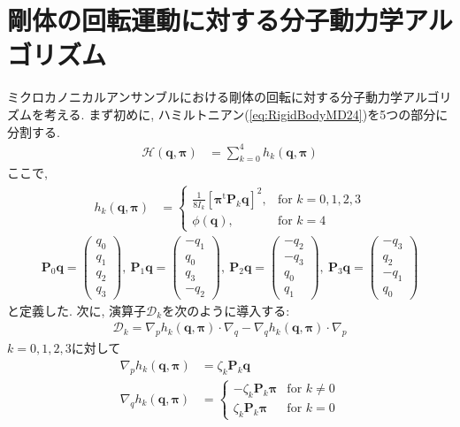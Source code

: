 \section{剛体の回転運動に対する分子動力学アルゴリズム}
ミクロカノニカルアンサンブルにおける剛体の回転に対する分子動力学アルゴリズムを考える.
まず初めに, ハミルトニアン(\ref{eq:RigidBodyMD24})を5つの部分に分割する. 
\begin{align}
 \mathcal{H}(\bm{q}, \bm{\pi})
 &=
 \sum_{k=0}^{4} h_{k} (\bm{q}, \bm{\pi})
\end{align}
ここで, 
\begin{align}
 h_{k} (\bm{q}, \bm{\pi}) &=
 \begin{cases}
  \frac{1}{8 I_{k}} [\bm{\pi}^{\mathrm{t}}\bm{P}_{k}\bm{q}]^{2}, &\text{for $k=0,1,2,3$} \\
  \phi(\bm{q}),& \text{for $k=4$}
 \end{cases}
\end{align}
\begin{align}
  \bm{P}_{0} \bm{q} =
  \begin{pmatrix}
    q_{0} \\ q_{1} \\ q_{2} \\ q_{3}
  \end{pmatrix},~
 \bm{P}_{1} \bm{q} =
 \begin{pmatrix}
   -q_{1} \\ q_{0} \\ q_{3} \\ -q_{2}
 \end{pmatrix},~
 \bm{P}_{2} \bm{q} =
 \begin{pmatrix}
   -q_{2} \\ -q_{3} \\ q_{0} \\ q_{1}
 \end{pmatrix},~
\bm{P}_{3} \bm{q} =
\begin{pmatrix}
  -q_{3} \\ q_{2} \\ -q_{1} \\ q_{0}
\end{pmatrix}
\end{align}
と定義した. 次に, 演算子$\mathcal{D}_{k}$を次のように導入する:
\begin{align}
 \mathcal{D}_{k}
 =
 \nabla_{p} h_{k} (\bm{q}, \bm{\pi}) \cdot \nabla_{q}
 -
 \nabla_{q} h_{k} (\bm{q}, \bm{\pi}) \cdot \nabla_{p}
\end{align}
$k=0,1,2,3$に対して
\begin{align}
 \nabla_{p} h_{k} (\bm{q}, \bm{\pi})
 &=
  \zeta_{k} \bm{P}_{k} \bm{q}
 \\
 \nabla_{q} h_{k} (\bm{q}, \bm{\pi})
 &=
 \begin{cases}
  -  \zeta_{k} \bm{P}_{k} \bm{\pi} &\text{for $k \neq 0$} \\
     \zeta_{k} \bm{P}_{k} \bm{\pi} &\text{for $k =    0$} 
 \end{cases}
\end{align}
